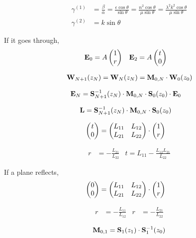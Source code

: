 \begin{align*}
	\gamma^{(1)} &= \frac{\beta}{\alpha} = \frac{\epsilon \cos\theta}{\sin\theta} = \frac{n^2 \cos\theta}{\mu \sin\theta} = \frac{\lambda^2 k^2 \cos\theta}{\mu \sin\theta} \\
	\gamma^{(2)} &= k\sin\theta
\end{align*}

If it goes through,
\begin{align*}
	\vb{E}_0 &= A\pmqty{1 \\ r} & \vb{E}_2 &= A\pmqty{t \\ 0}
\end{align*}

\begin{align*}
	\vb{W}_{N+1}\pqty{z_N} = \vb{W}_N\pqty{z_N} = \vb{M}_{0,N}\cdot{}\vb{W}_0\pqty{z_0}
\end{align*}

\begin{align*}
	\vb{E}_N &= \vb{S}_{N+1}^{-1}\pqty{z_N} \cdot \vb{M}_{0,N}\cdot{}\vb{S}_0\pqty{z_0}\cdot\vb{E}_0
\end{align*}

\begin{align*}
	\vb{L} &= \vb{S}_{N+1}^{-1}\pqty{z_N} \cdot \vb{M}_{0,N}\cdot{}\vb{S}_0\pqty{z_0}
\end{align*}

\begin{align*}
	\pmqty{t\\ 0} &= \pmqty{L_{11} & L_{12}\\L_{21}&L_{22}}\cdot\pmqty{1\\r}
\end{align*}

\begin{align*}
	r &= -\frac{L_{21}}{L_{22}} & t = L_{11} - \frac{L_{12}L_{21}}{L_{22}}
\end{align*}

If a plane reflects,
\begin{align*}
	\pmqty{0\\ 0} &= \pmqty{L_{11} & L_{12}\\L_{21}&L_{22}}\cdot\pmqty{1\\r}
\end{align*}

\begin{align*}
	 r &= - \frac{L_{11}}{L_{12}} & r &= -\frac{L_{21}}{L_{22}}
\end{align*}


\begin{align*}
	\vb{M}_{0,1} = \vb{S}_{1}\pqty{z_1} \cdot \vb{S}^{-1}_{1}\pqty{z_0}
\end{align*}

